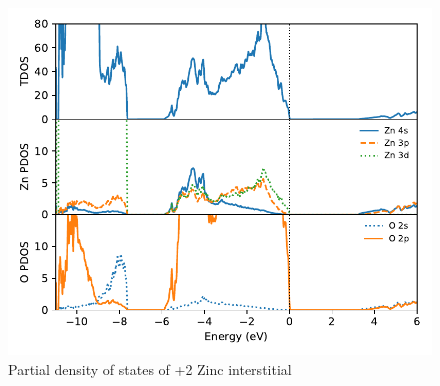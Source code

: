 \begin{figure}[tbh!]
	\centering
	\includegraphics[width=0.6\linewidth]{"images/rnd/dos-pdos_Zn_i-p2"}
	\caption[Partial density of states of +2 Zinc interstitial]{Partial density of states of +2 Zinc interstitial }
	\label{fig:dos-pdos_Zn_i-p2}
\end{figure}


\clearpage

